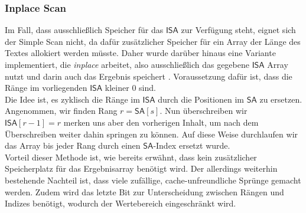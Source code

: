 \subsubsection{Inplace Scan}
Im Fall, dass ausschließlich Speicher für das $\mathsf{ISA}$ zur Verfügung steht, eignet sich der Simple Scan nicht, da dafür zusätzlicher Speicher für ein Array der Länge des Textes allokiert werden müsste. Daher wurde darüber hinaus eine Variante implementiert, die \textit{inplace} arbeitet, also ausschließlich das gegebene $\mathsf{ISA}$ Array nutzt und darin auch das Ergebnis speichert \cite{saca:8}. Voraussetzung dafür ist, dass die Ränge im vorliegenden $\mathsf{ISA}$ kleiner $0$ sind.\\
Die Idee ist, es zyklisch die Ränge im $\mathsf{ISA}$ durch die Positionen im $\mathsf{SA}$ zu ersetzen. Angenommen, wir finden Rang $r = \mathsf{SA}[s]$. Nun überschreiben wir $\mathsf{ISA}[r-1]=r$ merken uns aber den vorherigen Inhalt, um nach dem Überschreiben weiter dahin springen zu können. Auf diese Weise durchlaufen wir das Array bis jeder Rang durch einen $\mathsf{SA}$-Index ersetzt wurde.\\
Vorteil dieser Methode ist, wie bereits erwähnt, dass kein zusätzlicher Speicherplatz für das Ergebnisarray benötigt wird. Der allerdings weiterhin bestehende Nachteil ist, dass viele zufällige, cache-unfreundliche Sprünge gemacht werden. Zudem wird das letzte Bit zur Unterscheidung zwischen Rängen und Indizes benötigt, wodurch der Wertebereich eingeschränkt wird.
